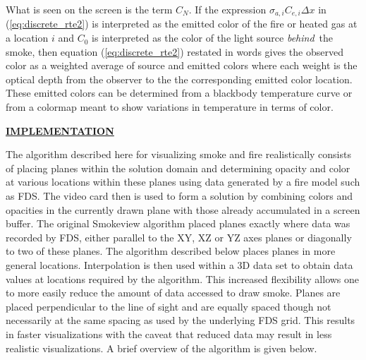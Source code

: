 \documentclass[11pt]{article}
\newcommand{\ssection}[1]{\underline{\bf #1}}
\begin{document}
\noindent What is seen on the screen is the term $C_N$.
If the expression $\sigma_{a,i}C_{e,i}\Delta x$ in (\ref{eq:discrete_rte2}) is interpreted as
the emitted color of the fire or
heated gas at a location $i$ and $C_0$ is interpreted as the color
of the light source {\em behind}\ the smoke, then equation
(\ref{eq:discrete_rte2}) restated in words gives the observed color
as a weighted average of source and emitted
colors where each weight is the optical depth from the observer to
the the corresponding emitted color location.  These emitted colors can be
determined from a blackbody temperature curve or from a colormap
meant to show variations in temperature in terms of color.


\ssection{IMPLEMENTATION}

The algorithm described here for visualizing smoke and fire realistically consists of placing
planes within the solution domain and determining opacity and color
at various locations within these planes
using data generated by a fire model such as FDS.  The video card then is
used to form a solution by combining colors and opacities in the currently drawn
plane with those already accumulated in a screen buffer.
The original Smokeview algorithm placed planes exactly where data was recorded by FDS,
either parallel to the XY, XZ or YZ axes planes or diagonally to two of these planes.
The algorithm described below places planes in more general locations. Interpolation is then used
within a 3D data set to obtain data values at locations required by the algorithm.
This increased flexibility
allows one to more easily reduce the amount of data accessed to draw smoke.
Planes are placed perpendicular to the line of sight and are equally spaced though not
necessarily at the same spacing as used by the underlying FDS grid.
This results in faster visualizations with the caveat that reduced data may result
in less realistic visualizations.  A brief overview of the algorithm is given below.
\end{document}
